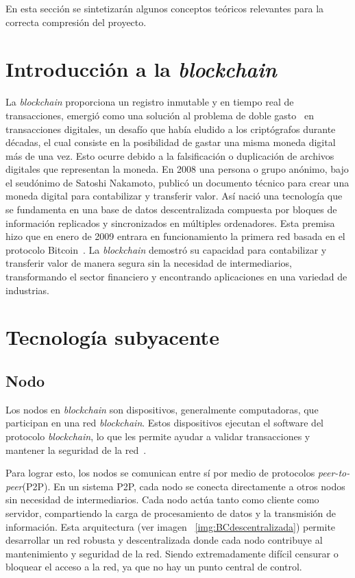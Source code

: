 
En esta sección se sintetizarán algunos conceptos teóricos relevantes para la correcta compresión del proyecto.

\section{Introducción a la \textit{blockchain}}

La \textit{blockchain} proporciona un registro inmutable y en tiempo real de transacciones, emergió como una solución al problema de doble gasto~\cite{dobleGasto} en transacciones digitales, un desafío que había eludido a los criptógrafos durante décadas, el cual consiste en la posibilidad de gastar una misma moneda digital más de una vez. Esto ocurre debido a la falsificación o duplicación de archivos digitales que representan la moneda.
En 2008 una persona o grupo anónimo, bajo el seudónimo de Satoshi Nakamoto, publicó un documento técnico para crear una moneda digital para contabilizar y transferir valor. Así nació una tecnología que se fundamenta en una base de datos descentralizada compuesta por bloques de información replicados y sincronizados en múltiples ordenadores.  
Esta premisa hizo que en enero de 2009 entrara en funcionamiento la primera red basada en el protocolo Bitcoin~\cite{introducciónBitcoin}.
La \textit{blockchain} demostró su capacidad para contabilizar y transferir valor de manera segura sin la necesidad de intermediarios, transformando el sector financiero y encontrando aplicaciones en una variedad de industrias.



\section{Tecnología subyacente}


\subsection{Nodo}

Los nodos en \textit{blockchain} son dispositivos, generalmente computadoras, que participan en una red \textit{blockchain}. Estos dispositivos ejecutan el software del protocolo \textit{blockchain}, lo que les permite ayudar a validar transacciones y mantener la seguridad de la red~\cite{IntroducciónNodo}.

Para lograr esto, los nodos se comunican entre sí por medio de protocolos \textit{peer-to-peer}(P2P). En un sistema P2P, cada nodo se conecta directamente a otros nodos sin necesidad de intermediarios. Cada nodo actúa tanto como cliente como servidor, compartiendo la carga de procesamiento de datos y la transmisión de información.
Esta arquitectura (ver imagen ~\ref{img:BCdescentralizada}) permite desarrollar un red robusta y descentralizada donde cada nodo contribuye al mantenimiento y seguridad de la red. Siendo extremadamente difícil censurar o bloquear el acceso a la red, ya que no hay un punto central de control.

